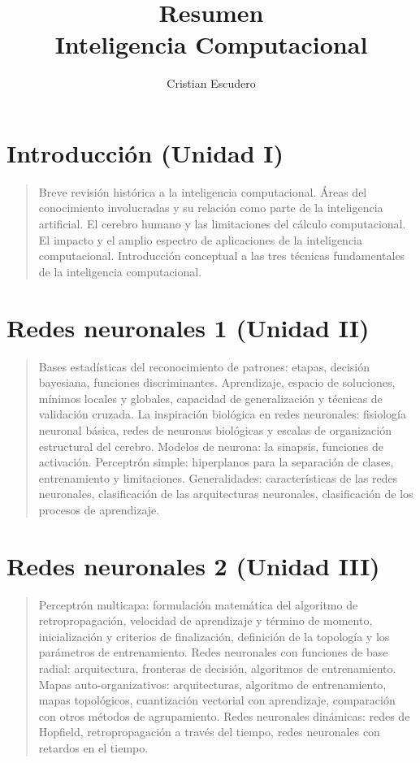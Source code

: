 \documentclass[10pt,a4paper]{article}
\author{Cristian Escudero}
\title{Resumen\\Inteligencia Computacional}
\begin{document}
\section*{Introducción (Unidad I)}
\begin{quote}
Breve revisión histórica a la inteligencia computacional. Áreas del conocimiento involucradas y su relación como parte de la inteligencia artificial. El cerebro humano y las limitaciones del cálculo computacional. El impacto y el amplio espectro de aplicaciones de la inteligencia computacional. Introducción conceptual a las tres técnicas fundamentales de la inteligencia computacional.
\end{quote}

\section*{Redes neuronales 1 (Unidad II)}
\begin{quote}
Bases estadísticas del reconocimiento de patrones: etapas, decisión bayesiana, funciones discriminantes. Aprendizaje, espacio de soluciones, mínimos locales y globales, capacidad de generalización y técnicas de validación cruzada. La inspiración biológica en redes neuronales: fisiología neuronal básica, redes de neuronas biológicas y escalas de organización estructural del cerebro. Modelos de neurona: la sinapsis, funciones de activación. Perceptrón simple: hiperplanos para la separación de clases, entrenamiento y limitaciones. Generalidades: características de las redes neuronales, clasificación de las arquitecturas neuronales, clasificación de los procesos de aprendizaje.
\end{quote}

\section*{Redes neuronales 2 (Unidad III)}
\begin{quote}
Perceptrón multicapa: formulación matemática del algoritmo de retropropagación, velocidad de aprendizaje y término de momento, inicialización y criterios de finalización, definición de la topología y los parámetros de entrenamiento. Redes neuronales con funciones de base radial: arquitectura, fronteras de decisión, algoritmos de entrenamiento. Mapas auto-organizativos: arquitecturas, algoritmo de entrenamiento, mapas topológicos, cuantización vectorial con aprendizaje, comparación con otros métodos de agrupamiento. Redes neuronales dinámicas: redes de Hopfield, retropropagación a través del tiempo, redes neuronales con retardos en el tiempo.
\end{quote}
\end{document}
